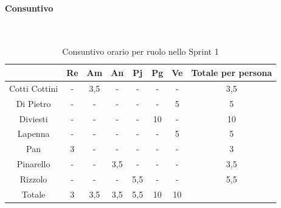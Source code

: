 \documentclass{article}
\begin{document}
                \paragraph{Consuntivo}\mbox{}\\
                \begin{table}[H]
                    \centering
                    \begin{tabular}{|c|c|c|c|c|c|c|c|}
                    \hline
                                    & Re  & Am  & An  & Pj  & Pg  & Ve  & Totale per persona \\ \hline
                    Cotti Cottini & -   & 3,5 & -   & -   & -   & -   & 3,5                \\ \hline
                    Di Pietro     & -   & -   & -   & -   & -   & 5   & 5                  \\ \hline
                    Diviesti      & -   & -   & -   & -   & 10  & -   & 10                 \\ \hline
                    Lapenna       & -   & -   & -   & -   & -   & 5   & 5                  \\ \hline
                    Pan           & 3   & -   & -   & -   & -   & -   & 3                  \\ \hline
                    Pinarello     & -   & -   & 3,5 & -   & -   & -   & 3,5                \\ \hline
                    Rizzolo       & -   & -   & -   & 5,5 & -   & -   & 5,5                \\ \hline
                    Totale        & 3   & 3,5 & 3,5 & 5,5 & 10  & 10  &                    \\ \hline
                    \end{tabular}
                    \caption{Consuntivo orario per ruolo nello Sprint 1}
                \end{table}

\end{document}
